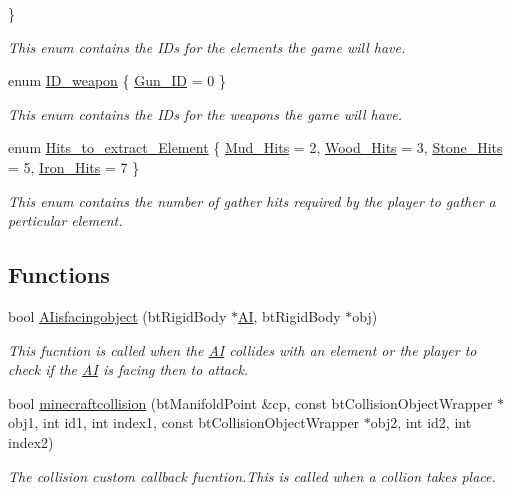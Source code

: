 \begin{DoxyCompactItemize}
 \}
\begin{DoxyCompactList}\small\item\em This enum contains the I\+Ds for the elements the game will have. \end{DoxyCompactList}\item 
enum \hyperlink{namespaceoctet_a9b5c767b2f5906d32938347f219f29d8}{I\+D\+\_\+weapon} \{ \hyperlink{namespaceoctet_a9b5c767b2f5906d32938347f219f29d8aba4bbd933933361c95782aeef88f84b6}{Gun\+\_\+\+I\+D} = 0
 \}
\begin{DoxyCompactList}\small\item\em This enum contains the I\+Ds for the weapons the game will have. \end{DoxyCompactList}\item 
enum \hyperlink{namespaceoctet_ae8a703c3351a9f48aa7ad96fc57c55b4}{Hits\+\_\+to\+\_\+extract\+\_\+\+Element} \{ \hyperlink{namespaceoctet_ae8a703c3351a9f48aa7ad96fc57c55b4a750c23f53924dfbcd9fb50ca61e8f480}{Mud\+\_\+\+Hits} = 2, 
\hyperlink{namespaceoctet_ae8a703c3351a9f48aa7ad96fc57c55b4a7827d8f1739c787a24f280dd43555860}{Wood\+\_\+\+Hits} = 3, 
\hyperlink{namespaceoctet_ae8a703c3351a9f48aa7ad96fc57c55b4aed66fa47b7558f768b7e5e30cd526e89}{Stone\+\_\+\+Hits} = 5, 
\hyperlink{namespaceoctet_ae8a703c3351a9f48aa7ad96fc57c55b4a05e2baa4de05be589af50ab12a54ab67}{Iron\+\_\+\+Hits} = 7
 \}
\begin{DoxyCompactList}\small\item\em This enum contains the number of gather hits required by the player to gather a perticular element. \end{DoxyCompactList}\end{DoxyCompactItemize}
\subsection*{Functions}
\begin{DoxyCompactItemize}
\item 
bool \hyperlink{namespaceoctet_a18649e9a2945ba720f8b1454433bffb9}{A\+Iisfacingobject} (bt\+Rigid\+Body $\ast$\hyperlink{structoctet_1_1_a_i}{A\+I}, bt\+Rigid\+Body $\ast$obj)
\begin{DoxyCompactList}\small\item\em This fucntion is called when the \hyperlink{structoctet_1_1_a_i}{A\+I} collides with an element or the player to check if the \hyperlink{structoctet_1_1_a_i}{A\+I} is facing then to attack. \end{DoxyCompactList}\item 
bool \hyperlink{namespaceoctet_a612adfaf8e4ba9b7d22fec5b9a2672b7}{minecraftcollision} (bt\+Manifold\+Point \&cp, const bt\+Collision\+Object\+Wrapper $\ast$obj1, int id1, int index1, const bt\+Collision\+Object\+Wrapper $\ast$obj2, int id2, int index2)
\begin{DoxyCompactList}\small\item\em The collision custom callback fucntion.\+This is called when a collion takes place. \end{DoxyCompactList}\end{DoxyCompactItemize}


